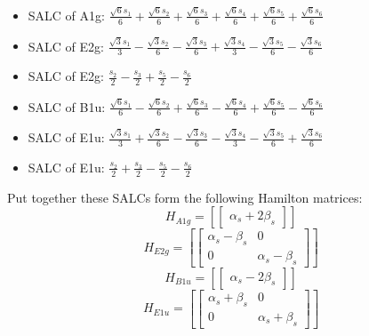 \documentclass[12pt,a4paper]{article}
\begin{document}
\begin{itemize}
\item SALC of A1g: \quad $\frac{\sqrt{6} s_{1}}{6} + \frac{\sqrt{6} s_{2}}{6} + \frac{\sqrt{6} s_{3}}{6} + \frac{\sqrt{6} s_{4}}{6} + \frac{\sqrt{6} s_{5}}{6} + \frac{\sqrt{6} s_{6}}{6}$
\item SALC of E2g: \quad $\frac{\sqrt{3} s_{1}}{3} - \frac{\sqrt{3} s_{2}}{6} - \frac{\sqrt{3} s_{3}}{6} + \frac{\sqrt{3} s_{4}}{3} - \frac{\sqrt{3} s_{5}}{6} - \frac{\sqrt{3} s_{6}}{6}$
\item SALC of E2g: \quad $\frac{s_{2}}{2} - \frac{s_{3}}{2} + \frac{s_{5}}{2} - \frac{s_{6}}{2}$
\item SALC of B1u: \quad $\frac{\sqrt{6} s_{1}}{6} - \frac{\sqrt{6} s_{2}}{6} + \frac{\sqrt{6} s_{3}}{6} - \frac{\sqrt{6} s_{4}}{6} + \frac{\sqrt{6} s_{5}}{6} - \frac{\sqrt{6} s_{6}}{6}$
\item SALC of E1u: \quad $\frac{\sqrt{3} s_{1}}{3} + \frac{\sqrt{3} s_{2}}{6} - \frac{\sqrt{3} s_{3}}{6} - \frac{\sqrt{3} s_{4}}{3} - \frac{\sqrt{3} s_{5}}{6} + \frac{\sqrt{3} s_{6}}{6}$
\item SALC of E1u: \quad $\frac{s_{2}}{2} + \frac{s_{3}}{2} - \frac{s_{5}}{2} - \frac{s_{6}}{2}$
\end{itemize}
Put together these SALCs form the following Hamilton matrices:
     $$ H_{A1g}= \left[\begin{bmatrix}\alpha_{s} + 2 \beta_{s}\end{bmatrix}\right]$$ 
     $$ H_{E2g}= \left[\begin{bmatrix}\alpha_{s} - \beta_{s} & 0\\0 & \alpha_{s} - \beta_{s}\end{bmatrix}\right]$$ 
     $$ H_{B1u}= \left[\begin{bmatrix}\alpha_{s} - 2 \beta_{s}\end{bmatrix}\right]$$ 
     $$ H_{E1u}= \left[\begin{bmatrix}\alpha_{s} + \beta_{s} & 0\\0 & \alpha_{s} + \beta_{s}\end{bmatrix}\right]$$ 
\end{document}
